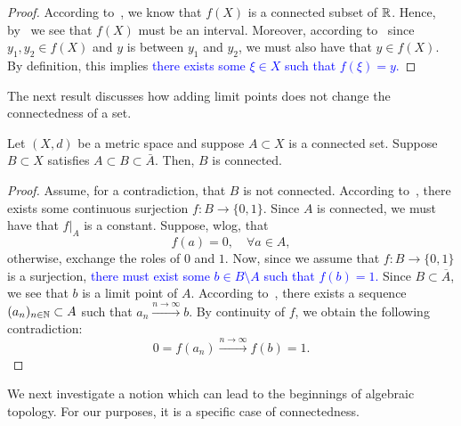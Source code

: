 \begin{proof}
	According to~, we know that $f(X)$ is a connected subset of $\mathbb{R}$. Hence, by~ we see that $f(X)$ must be an interval. Moreover, according to~ since $y_1,y_2 \in f(X)$ and $y$ is between $y_1$ and $y_2$, we must also have that $y \in f(X)$. By definition, this implies \textcolor{blue}{there exists some $\xi \in X$ such that $f(\xi) = y$.}
\end{proof}
The next result discusses how adding limit points does not change the connectedness of a set.
\begin{prop}
	Let $(X,d)$ be a metric space and suppose $A\subset X$ is a connected set. Suppose $B\subset X$ satisfies $A\subset B \subset \bar{A}$. Then, $B$ is connected.
\end{prop}
\begin{proof}
	Assume, for a contradiction, that $B$ is not connected. According to~, there exists some continuous surjection $f:B\to \{0,1\}$. Since $A$ is connected, we must have that $f|_A$ is a constant. Suppose, wlog, that
	\[
	f(a) = 0,\quad\forall a\in A,
	\]
	otherwise, exchange the roles of $0$ and $1$. Now, since we assume that $f:B\to \{0,1\}$ is a surjection, \textcolor{blue}{there must exist some $b\in B\setminus A$ such that $f(b) = 1$.} Since $B\subset \overline{A}$, we see that $b$ is a limit point of $A$. According to~, there exists a sequence $(a_n)_{n\in\mathbb{N}}\subset A$ such that $a_n \overset{n\to\infty}{\to} b$. By continuity of $f$, we obtain the following contradiction:
	\[
	0 = f(a_n) \overset{n\to\infty}{\to} f(b) = 1.
	\]
\end{proof}
We next investigate a notion which can lead to the beginnings of algebraic topology. For our purposes, it is a specific case of connectedness.
